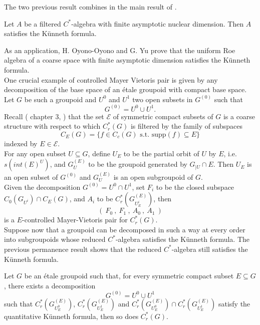 The two previous result combines in the main result of \cite{OY4}.
\begin{thm}
Let $A$ be a filtered $C^*$-algebra with finite asymptotic nuclear dimension. Then $A$ satisfies the Künneth formula. \end{thm}

As an application, H. Oyono-Oyono and G. Yu prove that the uniform Roe algebra of a coarse space with finite asymptotic dimension satisfies the Künneth formula.\\

One crucial example of controlled Mayer Vietoris pair is given by any decomposition of the base space of an \'etale groupoid with compact base space. Let $G$ be such a groupoid and $U^0$ and $U^1$ two open subsets in $G^{(0)}$ such that
\[G^{(0)} = U^0 \cup U^1. \]
Recall (\cite{DellAieraThesis} chapter $3$, \cite{dell2017controlled}) that the set $\mathcal E$ of symmetric compact subsets of $G$ is a coarse structure with respect to which $C_r^*(G)$ is filtered by the family of subspaces 
\[C_E(G) = \{ f\in C_c(G) \text{ s.t. supp}(f)\subseteq E  \}\]
indexed by $E\in \mathcal E$.\\

For any open subset $U\subseteq G$, define $U_E$ to be the partial orbit of $U$ by $E$, i.e. $s(int(E)^U)$, and $G^{(E)}_U$ to be the groupoid generated by $G_{|U}\cap E$. Then $U_E$ is an open subset of $G^{(0)}$ and $G^{(E)}_U$ is an open subgroupoid of $G$.\\
 
Given the decomposition $G^{(0)}= U^0 \cap U^1$, set $F_i$ to be the closed subspace $C_0(G_{U^i})\cap C_E(G)$, and $A_i$ to be $C_r^*(G_{U^i_E}^{(E)})$, then 
\[\left( \ F_0 \ , \ F_1 \ , \ A_0 \ , \ A_1 \  \right)\]
is a $E$-controlled Mayer-Vietoris pair for $C_r^*(G)$. \\

Suppose now that a groupoid can be decomposed in such a way at every order into subgroupoids whose reduced $C^*$-algebra satisfies the Künneth formula. The previous permanence result shows that the reduced $C^*$-algebra still satisfies the Künneth formula. 

\begin{prop} Let $G$ be an \'etale groupoid such that, for every symmetric compact subset $E\subseteq G$, there exists a decomposition 
\[G^{(0)} = U^0 \cup U^1\]
such that $C^*_r(G_{U^0_E}^{(E)})$, $C^*_r(G_{U^1_E}^{(E)})$  and $C^*_r(G_{U^0_E}^{(E)}) \cap C^*_r(G_{U^1_E}^{(E)})$ satisfy the quantitative Künneth formula, then so does $C^*_r(G)$.
\end{prop}

